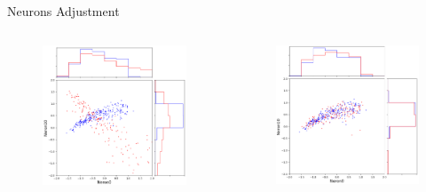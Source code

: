 \documentclass{beamer}
\begin{document}
\begin{frame}{Neurons Adjustment}
  \begin{columns}
    \begin{column}[t]{.48\textwidth}
      \begin{figure}[ht]
        \centering
        \includegraphics[width=1.0\textwidth,height=0.7\textheight]{figures/neuron_adjustment_before.png}
        \caption*{\label{fig:neuron-before}}
      \end{figure}
    \end{column}
    \begin{column}[t]{.48\textwidth}
      \begin{figure}[ht]
        \centering
        \includegraphics[width=1.0\textwidth,height=0.7\textheight]{figures/neuron_adjustment_after.png}

\end{figure}
\end{column}
\end{columns}
\end{frame}
\end{document}
